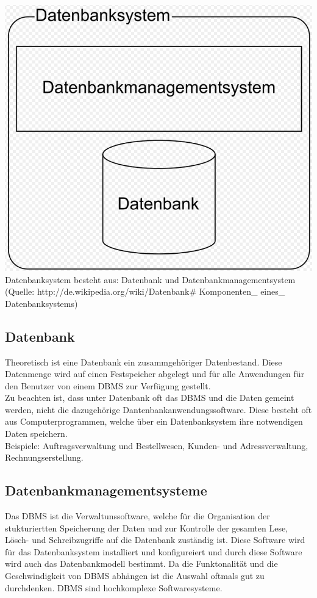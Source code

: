 \documentclass[12pt,a4paper]{report}
\begin{document}
\begin{onehalfspace}
\begin{center}
\includegraphics[scale=0.3]{img/dbs.png}\\
Datenbanksystem besteht aus: Datenbank und Datenbankmanagementsystem (Quelle: http://de.wikipedia.org/wiki/Datenbank\# Komponenten\_ eines\_ Datenbanksystems)
\end{center}

\subsection{Datenbank}
Theoretisch ist eine Datenbank ein zusammgehöriger Datenbestand. 
Diese Datenmenge wird auf einen Festspeicher abgelegt und für alle Anwendungen für den Benutzer von einem DBMS zur Verfügung gestellt.\\

Zu beachten ist, dass unter Datenbank oft das DBMS und die Daten gemeint werden, nicht die dazugehörige Dantenbankanwendungssoftware. Diese besteht oft aus Computerprogrammen, welche über ein Datenbanksystem ihre notwendigen Daten speichern.
\\Beispiele: Auftragsverwaltung und Bestellwesen, Kunden- und Adressverwaltung, Rechnungserstellung.

\subsection{Datenbankmanagementsysteme}
Das DBMS ist die Verwaltunssoftware, welche für die Organisation der stukturiertten  Speicherung der Daten und zur Kontrolle der gesamten Lese, Lösch- und Schreibzugriffe auf die Datenbank zuständig ist.
Diese Software wird für das Datenbanksystem installiert und konfigureiert und durch diese Software wird auch das Datenbankmodell bestimmt.
Da die Funktonalität und die Geschwindigkeit von DBMS abhängen ist die Auswahl oftmals gut zu durchdenken.
DBMS sind hochkomplexe Softwaresysteme.\\


\end{onehalfspace}
\end{document}

